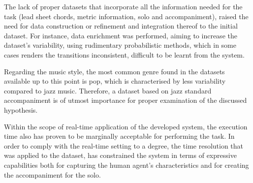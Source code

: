     The lack of proper datasets that incorporate all the information needed for the task (lead sheet chords, metric information, solo and accompaniment), raised the need for data construction or refinement and integration thereof to the initial dataset. For instance, data enrichment was performed, aiming to increase the dataset's variability, using rudimentary probabilistic methods, which in some cases renders the transitions inconsistent, difficult to be learnt from the system. 

    Regarding the music style, the most common genre found in the datasets available up to this point is pop, which is characterised by less variability compared to jazz music. Therefore, a dataset based on jazz standard accompaniment is of utmost importance for proper examination of the discussed hypothesis. 

    Within the scope of real-time application of the developed system, the execution time also has proven to be marginally acceptable for performing the task. In order to comply with the real-time setting to a degree, the time resolution that was applied to the dataset, has constrained the system in terms of expressive capabilities both for capturing the human agent's characteristics and for creating the accompaniment for the solo.
